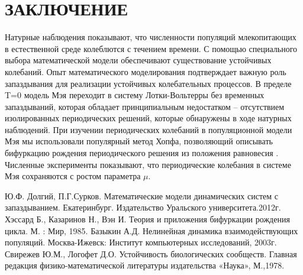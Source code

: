 \documentclass[12pt]{article}
\begin{document}
\section*{ЗАКЛЮЧЕНИЕ}
Натурные наблюдения показывают, что численности популяций млекопитающих в естественной среде колеблются с течением времени. С помощью специального выбора математической модели обеспечивают существование устойчивых колебаний. Опыт математического моделирования подтверждает важную роль запаздывания для реализации устойчивых колебательных процессов. В пределе T=0 модель Мэя \cite{has} переходит в систему Лотки-Вольтерры без временных запаздываний, которая обладает принципиальным недостатком – отсутствием изолированных периодических решений, которые обнаружены в ходе натурных наблюдений.
При изучении периодических колебаний в популяционной модели Мэя  мы использовали популярный метод Хопфа, позволяющий описывать бифуркацию рождения периодического решения из положения  равновесия \cite{has}. Численные эксперименты показывают, что периодические колебания в системе Мэя сохраняются с ростом параметра $\mu$.

\newpage
\begin{thebibliography}{5}
    Ю.Ф. Долгий, П.Г.Сурков. Математические модели динамических систем с запаздыванием. Екатеринбург. Издательство Уральского университета.2012г.
    Хэссард Б., Казаринов Н., Вэн И. Теория и приложения бифуркации рождения цикла. М. : Мир, 1985.
    Базыкин А.Д. Нелинейная динамика взаимодействующих популяций. Москва-Ижевск: Институт компьютерных исследований, 2003г.
    Свирежев Ю.М., Логофет Д.О. Устойчивость биологических сообществ. Главная редакция физико-математической литературы издательства «Наука», М.,1978.
    \end{thebibliography}

\appendix

\end{document}
